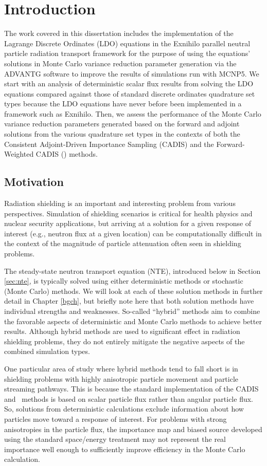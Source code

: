 \chapter{Introduction}

The work covered in this dissertation includes the implementation of the Lagrange 
Discrete Ordinates (LDO) equations in the Exnihilo parallel neutral particle radiation 
transport framework for the purpose of using the equations' solutions in Monte Carlo
variance reduction parameter generation via the ADVANTG software to improve the results of
simulations run with MCNP5. We start with an analysis of deterministic 
scalar flux results from solving the LDO equations
compared against those of standard discrete ordinates quadrature set types because the 
LDO equations have never before been implemented in a framework such as Exnihilo. Then,
we assess the performance of the Monte Carlo variance reduction parameters generated 
based on the forward and adjoint solutions from the various quadrature set types in the contexts
of both the Consistent Adjoint-Driven Importance Sampling (CADIS) and the Forward-Weighted 
CADIS (\fwc) methods.

\section{Motivation}

Radiation shielding is an important and interesting problem from various perspectives.
Simulation of shielding scenarios is critical for health physics and nuclear security
applications, but arriving at a solution for a given response of interest (e.g., 
neutron flux at a given location) can be computationally difficult in the context of
the magnitude of particle attenuation often seen in shielding problems.

The steady-state neutron transport equation (NTE), introduced below in Section
\ref{sec:nte}, is typically solved using either deterministic methods or stochastic
(Monte Carlo) methods. We will look at each of these solution methods in further 
detail in Chapter \ref{bgch}, but briefly note here that both solution methods have
individual strengths and weaknesses. So-called ``hybrid'' methods aim to combine the
favorable aspects of deterministic and Monte Carlo methods to achieve better results.
Although hybrid methods are used to significant effect in radiation shielding problems,
they do not entirely mitigate the negative aspects of the combined simulation types.

One particular area of study where hybrid methods tend to fall short is in shielding
problems with highly anisotropic particle movement and particle streaming pathways.
This is because the standard implementation of the CADIS and \fwc\ methods is based on scalar
particle flux rather than angular particle flux. So, solutions from deterministic calculations
exclude information about how particles move toward a response of interest.
For problems with strong anisotropies in the particle flux, the importance map and biased source 
developed using the standard space/energy treatment may not represent the real importance well 
enough to sufficiently improve efficiency in the Monte Carlo calculation. 

